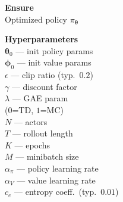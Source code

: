 \documentclass[11pt]{article}
\begin{document}
\begin{algorithm}[p]\small
\caption{PPO-Clip (Proximal Policy Optimization)}\label{alg:ppo}
\vspace{2pt}
\noindent
\begin{minipage}[t]{0.28\linewidth}
\renewcommand{\arraystretch}{1.12}
\textbf{Ensure} \\[2pt]
Optimized policy $\pi_{\boldsymbol{\theta}}$

\vspace{6pt}
\textbf{Hyperparameters} \\[2pt]
$\boldsymbol{\theta}_0$ --- init policy params \\
$\boldsymbol{\phi}_0$ --- init value params \\
$\epsilon$ --- clip ratio (typ.\ $0.2$) \\
$\gamma$ --- discount factor \\
$\lambda$ --- GAE param \\
\hspace*{1em}($0$=TD, $1$=MC) \\
$N$ --- actors \\
$T$ --- rollout length \\
$K$ --- epochs \\
$M$ --- minibatch size \\
$\alpha_\pi$ --- policy learning rate \\
$\alpha_V$ --- value learning rate \\
$c_e$ --- entropy coeff.\ (typ.\ $0.01$)


\end{minipage}
\end{algorithm}
\end{document}
